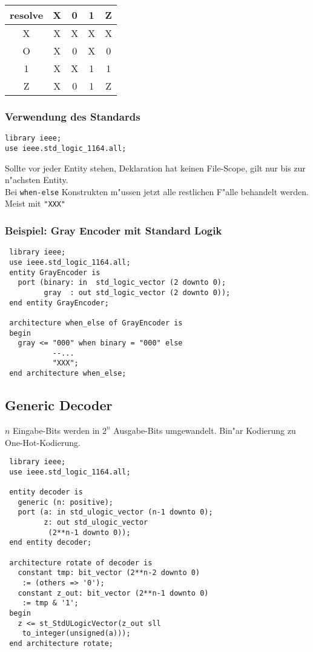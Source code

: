 \documentclass[german, 10pt, a4paper, twocolumn]{scrartcl}
\theoremstyle{definition}
\begin{document}
\begin{tabular}{c|cccc}
	resolve &	X &	0 &	1 &	Z\\\hline
	X &		X &	X &	X &	X\\
	O &		X &	0 &	X &	0\\
	1 &		X &	X &	1 &	1\\
	Z &		X &	0 &	1 &	Z
\end{tabular}

\subsubsection{Verwendung des Standards}

\begin{verbatim}
library ieee;
use ieee.std_logic_1164.all;
\end{verbatim}

Sollte vor jeder Entity stehen, Deklaration hat keinen File-Scope, gilt nur bis zur n"achsten Entity.\\

Bei \verb#when-else# Konstrukten m"ussen jetzt alle restlichen F"alle behandelt werden. Meist mit \verb#"XXX"#

\subsubsection{Beispiel: Gray Encoder mit Standard Logik}

\begin{verbatim}
 library ieee;
 use ieee.std_logic_1164.all;
 entity GrayEncoder is
   port (binary: in  std_logic_vector (2 downto 0);
         gray  : out std_logic_vector (2 downto 0)); 
 end entity GrayEncoder;

 architecture when_else of GrayEncoder is
 begin
   gray <= "000" when binary = "000" else
           --...
           "XXX";
 end architecture when_else;
\end{verbatim}


\subsection{Generic Decoder}

$n$ Eingabe-Bits werden in $2^n$ Ausgabe-Bits umgewandelt. Bin"ar Kodierung zu One-Hot-Kodierung.

\begin{verbatim}
 library ieee;
 use ieee.std_logic_1164.all;

 entity decoder is
   generic (n: positive);
   port (a: in std_ulogic_vector (n-1 downto 0);
         z: out std_ulogic_vector
          (2**n-1 downto 0));
 end entity decoder;

 architecture rotate of decoder is
   constant tmp: bit_vector (2**n-2 downto 0)
    := (others => '0');
   constant z_out: bit_vector (2**n-1 downto 0)
    := tmp & '1';
 begin
   z <= st_StdULogicVector(z_out sll
    to_integer(unsigned(a)));
 end architecture rotate; 
\end{verbatim}
\end{document}
